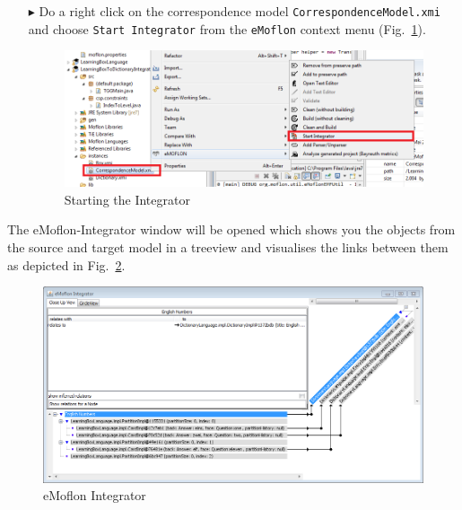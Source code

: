 \begin{enumerate}
\item[$\blacktriangleright$] Do a right click on the correspondence model \texttt{Correspondence\-Model\-.xmi} and choose \texttt{Start Integrator} from the \texttt{eMoflon} context menu (Fig.~\ref{fig:startintegrator}).

\begin{figure}[htbp]
\begin{center}
  \includegraphics[width=\textwidth]{pics/tggBilder/transformation/tgg29}
  \caption{Starting the Integrator}  
  \label{fig:startintegrator}
\end{center}
\end{figure} 
\end{enumerate}

The eMoflon-Integrator window will be opened which shows you the objects from the source and target model in a treeview and visualises the links between them as depicted in Fig.~\ref{fig:emoflonintegrator}.

\begin{figure}[htbp]
\begin{center}
  \includegraphics[width=\textwidth]{pics/tggBilder/transformation/tgg30}
  \caption{eMoflon Integrator}  
  \label{fig:emoflonintegrator}
\end{center}
\end{figure} 

